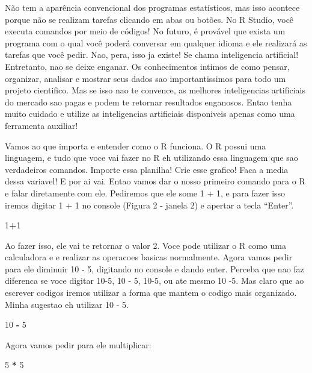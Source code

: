 \documentclass[
]{book}
\newenvironment{Shaded}{\begin{snugshade}}{\end{snugshade}}
\newcommand{\DecValTok}[1]{\textcolor[rgb]{0.00,0.00,0.81}{#1}}
\newcommand{\SpecialCharTok}[1]{\textcolor[rgb]{0.81,0.36,0.00}{\textbf{#1}}}
\begin{document}
Não tem a aparência convencional dos programas estatísticos, mas isso acontece porque não se realizam tarefas clicando em abas ou botões. No R Studio, você executa comandos por meio de códigos! No futuro, é provável que exista um programa com o qual você poderá conversar em qualquer idioma e ele realizará as tarefas que você pedir. Nao, pera, isso ja existe! Se chama inteligencia artificial! Entretanto, nao se deixe enganar. Os conhecimentos intimos de como pensar, organizar, analisar e mostrar seus dados sao importantissimos para todo um projeto cientifico. Mas se isso nao te convence, as melhores inteligencias artificiais do mercado sao pagas e podem te retornar resultados enganosos. Entao tenha muito cuidado e utilize as inteligencias artificiais disponiveis apenas como uma ferramenta auxiliar!

Vamos ao que importa e entender como o R funciona. O R possui uma linguagem, e tudo que voce vai fazer no R eh utilizando essa linguagem que sao verdadeiros comandos. Importe essa planilha! Crie esse grafico! Faca a media dessa variavel! E por ai vai. Entao vamos dar o nosso primeiro comando para o R e falar diretamente com ele. Pediremos que ele some 1 + 1, e para fazer isso iremos digitar 1 + 1 no console (Figura 2 - janela 2) e apertar a tecla ``Enter''.

\begin{Shaded}
\begin{Highlighting}[]
\DecValTok{1}\SpecialCharTok{+}\DecValTok{1}
\end{Highlighting}
\end{Shaded}

Ao fazer isso, ele vai te retornar o valor 2. Voce pode utilizar o R como uma calculadora e e realizar as operacoes basicas normalmente. Agora vamos pedir para ele diminuir 10 - 5, digitando no console e dando enter. Perceba que nao faz diferenca se voce digitar 10-5, 10 - 5, 10-5, ou ate mesmo 10 -5. Mas claro que ao escrever codigos iremos utilizar a forma que mantem o codigo mais organizado. Minha sugestao eh utilizar 10 - 5.

\begin{Shaded}
\begin{Highlighting}[]
\DecValTok{10} \SpecialCharTok{{-}} \DecValTok{5}
\end{Highlighting}
\end{Shaded}

Agora vamos pedir para ele multiplicar:

\begin{Shaded}
\begin{Highlighting}[]
\DecValTok{5} \SpecialCharTok{*} \DecValTok{5}
\end{Highlighting}
\end{Shaded}
\end{document}

